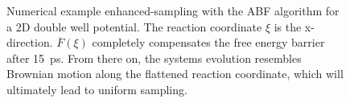 \begin{figure}[H]
    \centering
    \caption{Numerical example enhanced-sampling with the ABF algorithm for a 2D double well potential. The reaction coordinate $\xi$ is the x-direction. $\overline{F}(\xi)$ completely compensates the free energy barrier after 15~ps. From there on, the systems evolution resembles Brownian motion along the flattened reaction coordinate, which will ultimately lead to uniform sampling. }
\label{fig:ABF}%
\end{figure}

